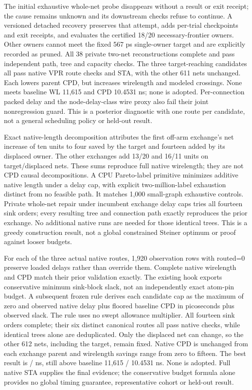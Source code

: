 \documentclass[10pt]{article}
\begin{document}
The initial exhaustive whole-net probe disappears without a result or
exit receipt; the cause remains unknown and its downstream checks
refuse to continue. A versioned detached recovery preserves that attempt,
adds per-trial checkpoints and exit receipts, and evaluates the certified
18/20 necessary-frontier owners. Other owners cannot meet the fixed
567 ps single-owner target and are explicitly recorded as pruned.
All 38 private two-net reconstructions complete and pass independent
path, tree and capacity checks. The three target-reaching candidates
all pass native VPR route checks and STA, with the other 611 nets
unchanged. Each lowers parent CPD, but increases wirelength and modeled
crossings. None meets baseline WL 11,615 and CPD 10.4531 ns; none is
adopted. Per-connection packed delay and the node-delay-class wire proxy
also fail their joint nonregression guard. This is a posterior diagnostic
with one route per candidate, not a general scheduling policy or held-out
result.

Exact native-length decomposition attributes the first off-arm exchange's
net increase of ten units to four saved by the target and fourteen added
by its displaced owner. The other exchanges add 13/20 and 16/11 units
on target/displaced nets. These sums reproduce full native wirelength;
they are not CPD causal decompositions.
A CPU Pareto-label primitive minimizes additive native length under a
delay cap, with explicit two-million-label exhaustion distinct from no
feasible path. It matches 1,000 small-graph exhaustive controls. Private
whole-net repair under incumbent exchange delay caps tries all fourteen
sink orders; every resulting tree and connection path exactly reproduces
the prior exchange. No additional native runs are needed for those
identical trees. This is a greedy construction result, not a global
constrained Steiner optimum or proof against looser budgets.

For each of the three actual native routes, 1,920 observation rows with
routed=0 preserve loaded delays rather than override them. Complete native
wirelength and CPD match their prior validation exactly. The existing
hook exports conservative minimum sink-block slack, not an independently
exact atom-pin budget. A subsequent frozen rule derives each candidate
cap as the maximum of zero and observed native delay plus floored baseline
CPD in picoseconds plus observed slack. The rule uses no swept allowance
multiplier. All fourteen sink orders complete; their six distinct
canonical routes all pass native checks, while identical trees alone are
deduplicated. Only the displaced net can change, so the other 612 nets,
including the target, remain fixed. Native CPD is unchanged from each
exchange parent and wirelength savings range from zero to fifteen.
The best result is \STARepairBestWL{} / \STARepairBestCPD{} ns, still above
baseline 11,615 / 10.4531 ns. None is adopted. Full native STA supplies
the final evidence; the conservative budget formula alone provides no
global timing guarantee, representative cohort or held-out result.
\end{document}
